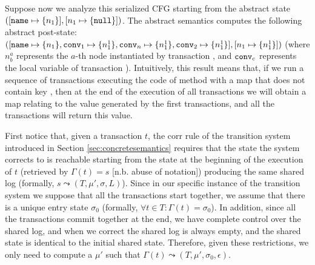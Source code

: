 Suppose now we analyze this serialized CFG starting from the abstract state $([\mathtt{name} \mapsto \{n_1\}], [n_1 \mapsto \{\mathtt{null}\}])$. The abstract semantics computes the following abstract post-state: $([\mathtt{name} \mapsto \{n_1\}, \mathtt{conv}_1 \mapsto \{n^1_1\}, \mathtt{conv}_n \mapsto \{n^1_1\}, \mathtt{conv}_2 \mapsto \{n^1_1\}], [n_1 \mapsto \{n^1_1\}])$ (where $n^a_b$ represents the $a$-th node instantiated by transaction , and $\mathtt{conv}_c$ represents the local variable  of transaction ). Intuitively, this result means that, if we run a sequence of transactions executing the code of method  with a map that does not contain key , then at the end of the execution of all transactions we will obtain a map relating  to the value generated by the first transactions, and all the transactions will return this value.

%
First notice that, given a transaction $t$, the {\sf corr} rule of the transition system introduced in Section \ref{sec:concretesemantics} requires that the state the system corrects to is reachable starting from the state at the beginning of the execution of $t$ (retrieved by $\Gamma(t) =s$ [n.b. abuse of notation]) producing the same shared log (formally, $s \leadsto (T,\mu', \sigma, L)$). Since in our specific instance of the transition system we suppose that all the transactions start together, we assume that there is a unique entry state $\sigma_0$ (formally, $\forall t \in T : \Gamma(t)=\sigma_0$). In addition, since all the transactions commit together at the end, we have complete control over the shared log, and when we correct the shared log is always empty, and the shared state is identical to the initial shared state. Therefore, given these restrictions, we only need to compute a $\mu'$ such that $\Gamma(t) \leadsto (T,\mu', \sigma_0, \epsilon)$.

